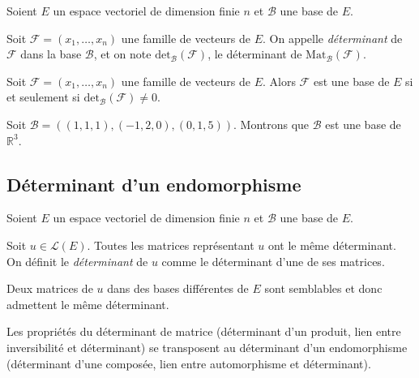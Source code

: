\documentclass[a4paper,10pt]{report}
\begin{document}
Soient $E$ un espace vectoriel de dimension finie $n$ et $\mathcal{B}$ une base de $E$.

\begin{Definition}{} Soit $\mathcal{F} = (x_1, \ldots, x_n)$ une famille de vecteurs de $E$. On appelle \emph{déterminant} de $\mathcal{F}$ dans la base $\mathcal{B}$, et on note $\textrm{det}_{\mathcal{B}}(\mathcal{F})$, le déterminant de $\textrm{Mat}_{\mathcal{B}}(\mathcal{F})$.
\end{Definition}

\begin{Proposition}{} Soit $\mathcal{F} = (x_1, \ldots, x_n)$ une famille de vecteurs de $E$. Alors $\mathcal{F}$ est une base de $E$ si et seulement si \newline $\textrm{det}_{\mathcal{B}}(\mathcal{F}) \neq 0$.
\end{Proposition}

\begin{Exemple} Soit $\mathcal{B}=((1,1,1), (-1,2,0), (0,1,5))$. Montrons que $\mathcal{B}$ est une base de $\mathbb{R}^3$.

\vspace{5.5cm}
\end{Exemple}

\subsection{Déterminant d'un endomorphisme}

Soient $E$ un espace vectoriel de dimension finie $n$ et $\mathcal{B}$ une base de $E$.

\begin{TheoremeDefinition}{} Soit $u \in \mathcal{L}(E)$. Toutes les matrices représentant $u$ ont le même déterminant. On définit le \emph{déterminant} de $u$ comme le déterminant d'une de ses matrices.
\end{TheoremeDefinition}

\begin{Demonstration}{} Deux matrices de $u$ dans des bases différentes de $E$ sont semblables et donc admettent le même déterminant.
\end{Demonstration}

\medskip


\begin{Proposition}{} Les propriétés du déterminant de matrice (déterminant d'un produit, lien entre inversibilité et déterminant) se transposent au déterminant d'un endomorphisme (déterminant d'une composée, lien entre automorphisme et déterminant).
\end{Proposition} 
\end{document}
